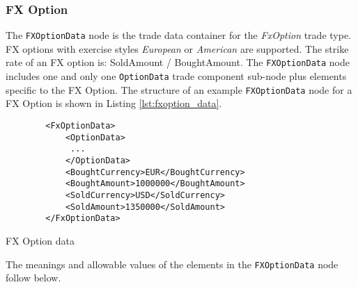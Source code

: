 \subsubsection{FX Option}

The \lstinline!FXOptionData!  node is the trade data container for the \emph{FxOption} trade type.   FX options with exercise styles  \emph{European} or \emph{American} are supported. 
The strike rate of an FX option is:
SoldAmount / BoughtAmount. The \lstinline!FXOptionData!  node includes one and only one \lstinline!OptionData! trade
component sub-node plus elements specific to the FX Option. The structure of an example \lstinline!FXOptionData! node
for a FX Option is shown in Listing \ref{lst:fxoption_data}.

\begin{listing}[H]
\begin{verbatim}
        <FxOptionData>
            <OptionData>
             ...
            </OptionData>
            <BoughtCurrency>EUR</BoughtCurrency>
            <BoughtAmount>1000000</BoughtAmount>
            <SoldCurrency>USD</SoldCurrency>
            <SoldAmount>1350000</SoldAmount>
        </FxOptionData>
\end{verbatim}
\caption{FX Option data}
\label{lst:fxoption_data}
\end{listing}

The meanings and allowable values of the elements in the \lstinline!FXOptionData!  node follow below.

